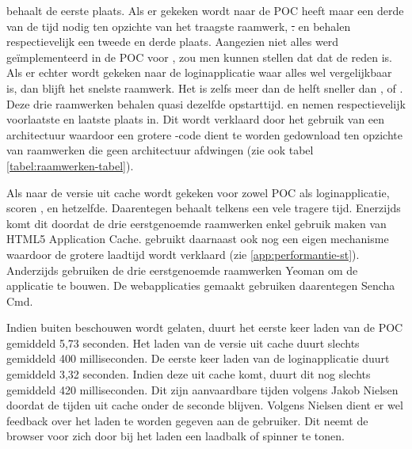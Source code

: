 \lungo{} behaalt de eerste plaats.
Als er gekeken wordt naar de POC heeft \lungo{} maar een derde van de tijd nodig ten opzichte van het traagste raamwerk, \st.
\jqm{} en \kendo{} behalen respectievelijk een tweede en derde plaats.
Aangezien niet alles werd geïmplementeerd in de POC voor \lungo{}, zou men kunnen stellen dat dat de reden is.
Als er echter wordt gekeken naar de loginapplicatie waar alles wel vergelijkbaar is, dan blijft \lungo{} het snelste raamwerk.
Het is zelfs meer dan de helft sneller dan \jqm{}, \kendo{} of \st{}.
Deze drie raamwerken behalen quasi dezelfde opstarttijd.
\kendo{} en \st{} nemen respectievelijk voorlaatste en laatste plaats in.
Dit wordt verklaard door het gebruik van een architectuur waardoor een grotere \js{}-code dient te worden gedownload ten opzichte van raamwerken die geen architectuur afdwingen (zie ook tabel \ref{tabel:raamwerken-tabel}).

Als naar de versie uit cache wordt gekeken voor zowel POC als loginapplicatie, scoren \kendo{}, \jqm{} en \lungo{} hetzelfde.
Daarentegen behaalt \st{} telkens een vele tragere tijd.
Enerzijds komt dit doordat de drie eerstgenoemde raamwerken enkel gebruik maken van HTML5 Application Cache.
\st{} gebruikt daarnaast ook nog een eigen mechanisme waardoor de grotere laadtijd wordt verklaard (zie \ref{app:performantie-st}).
Anderzijds gebruiken de drie eerstgenoemde raamwerken Yeoman om de applicatie te bouwen.
De webapplicaties gemaakt \st{} gebruiken daarentegen Sencha Cmd.


Indien \st{} buiten beschouwen wordt gelaten, duurt het eerste keer laden van de POC gemiddeld 5,73 seconden. 
Het laden van de versie uit cache duurt slechts gemiddeld 400 milliseconden.
De eerste keer laden van de loginapplicatie duurt gemiddeld 3,32 seconden.
Indien deze uit cache komt, duurt dit nog slechts gemiddeld 420 milliseconden.
Dit zijn aanvaardbare tijden volgens Jakob Nielsen~\cite{Nielsen1993} doordat de tijden uit cache onder de seconde blijven.
Volgens Nielsen dient er wel feedback over het laden te worden gegeven aan de gebruiker.
Dit neemt de browser voor zich door bij het laden een laadbalk of spinner te tonen.


